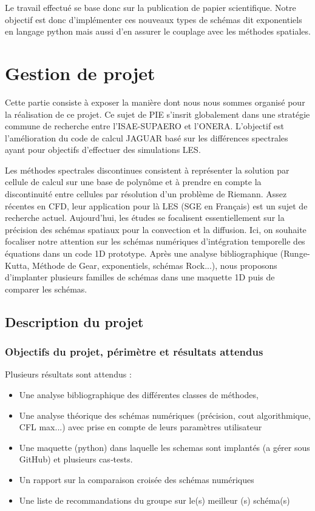 \documentclass[a4paper,12pt]{report}
\theoremstyle{break}
\begin{document}
Le travail effectué se base donc sur la publication de papier scientifique. Notre objectif est donc d'implémenter ces nouveaux types de schémas dit \og exponentiels \fg{} en langage python mais aussi d'en assurer le couplage avec les méthodes spatiales. 

\part{Gestion de projet}

\vfill

Cette partie consiste à exposer la manière dont nous nous sommes organisé pour la réalisation de ce projet. Ce sujet de PIE s'insrit globalement dans une stratégie commune de recherche entre l'ISAE-SUPAERO et l'ONERA. L'objectif est l'amélioration du code de calcul JAGUAR basé sur les différences spectrales ayant pour objectifs d'effectuer des simulations LES.


Les méthodes spectrales discontinues consistent à représenter la solution par cellule de calcul sur une base de polynôme et à prendre en compte la discontinuité entre cellules par résolution d’un problème de Riemann. Assez récentes en CFD, leur application pour là LES (SGE en Français) est un sujet de recherche actuel. Aujourd’hui, les études se focalisent essentiellement sur la précision des schémas spatiaux pour la convection et la diffusion. Ici, on souhaite focaliser notre attention sur les schémas numériques d’intégration temporelle des équations dans un code 1D prototype. Après une analyse bibliographique (Runge‐Kutta, Méthode de Gear, exponentiels, schémas Rock...), nous proposons d’implanter plusieurs familles de schémas dans une maquette 1D puis de comparer les schémas.

\vfill

\chapter{Description du projet}

\section{Objectifs du projet, périmètre et résultats attendus}
    Plusieurs résultats sont attendus : 
	\begin{itemize}[label=\textbullet,]
		\item Une analyse bibliographique des différentes classes de méthodes, 
		\item Une analyse théorique des schémas numériques (précision, cout algorithmique, CFL max...) avec prise en compte de leurs paramètres utilisateur 
		\item Une maquette (python) dans laquelle les schemas sont implantés (a gérer sous 
        GitHub) et plusieurs cas‐tests. 
		\item Un rapport sur la comparaison croisée des schémas numériques
		\item Une liste de recommandations du groupe sur le(s) meilleur (s) schéma(s)
	\end{itemize}
	
\end{document}
